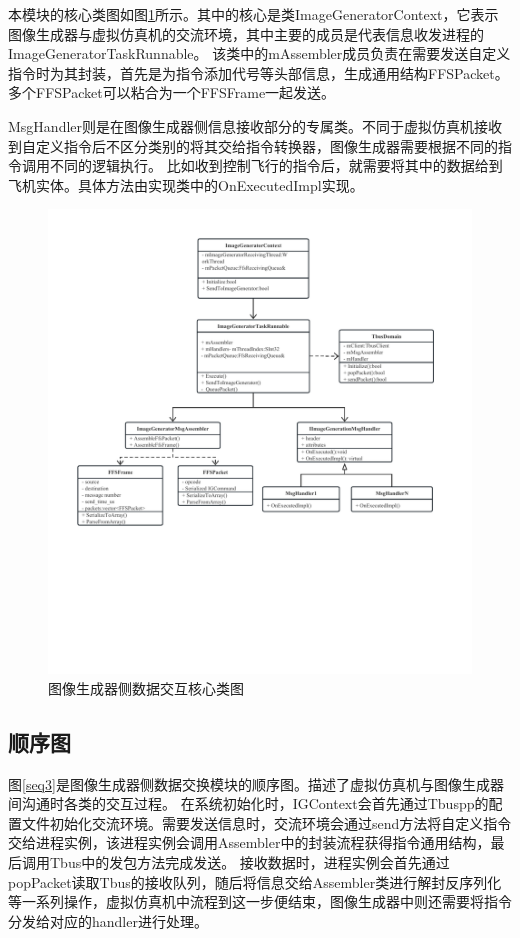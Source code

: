本模块的核心类图如图\ref{module32}所示。其中的核心是类ImageGeneratorContext，它表示图像生成器与虚拟仿真机的交流环境，其中主要的成员是代表信息收发进程的ImageGeneratorTaskRunnable。
该类中的mAssembler成员负责在需要发送自定义指令时为其封装，首先是为指令添加代号等头部信息，生成通用结构FFSPacket。多个FFSPacket可以粘合为一个FFSFrame一起发送。
\par
MsgHandler则是在图像生成器侧信息接收部分的专属类。不同于虚拟仿真机接收到自定义指令后不区分类别的将其交给指令转换器，图像生成器需要根据不同的指令调用不同的逻辑执行。
比如收到控制飞行的指令后，就需要将其中的数据给到飞机实体。具体方法由实现类中的OnExecutedImpl实现。
\begin{figure}[h!]
    \begin{center}
        \includegraphics[width=\textwidth]{pictures/classdiagram3.pdf}
        \caption{图像生成器侧数据交互核心类图}
        \label{module32}
    \end{center}
\end{figure}
\subsection{顺序图}
图\ref{seq3}是图像生成器侧数据交换模块的顺序图。描述了虚拟仿真机与图像生成器间沟通时各类的交互过程。
在系统初始化时，IGContext会首先通过Tbuspp的配置文件初始化交流环境。需要发送信息时，交流环境会通过send方法将自定义指令交给进程实例，该进程实例会调用Assembler中的封装流程获得指令通用结构，最后调用Tbus中的发包方法完成发送。
接收数据时，进程实例会首先通过popPacket读取Tbus的接收队列，随后将信息交给Assembler类进行解封反序列化等一系列操作，虚拟仿真机中流程到这一步便结束，图像生成器中则还需要将指令分发给对应的handler进行处理。

